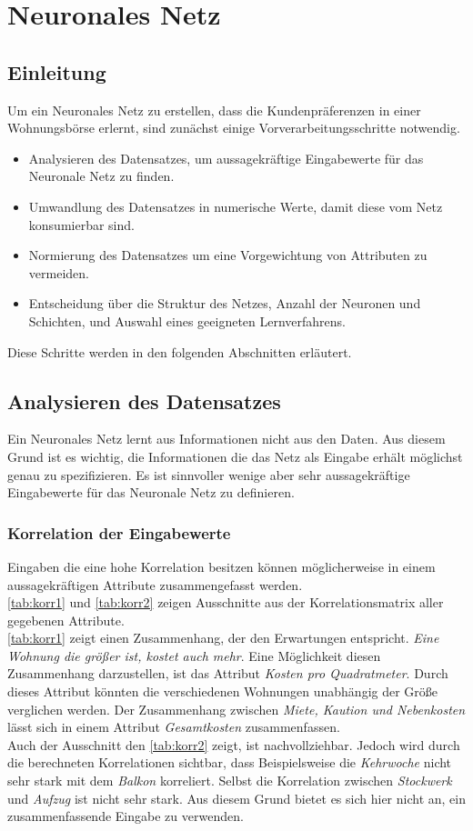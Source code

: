 \section{Neuronales Netz}\label{sec:kaptiel}
\subsection{Einleitung}
Um ein Neuronales Netz zu erstellen, dass die Kundenpräferenzen in einer Wohnungsbörse erlernt,
sind zunächst einige Vorverarbeitungsschritte notwendig.
\begin{itemize}
    \item Analysieren des Datensatzes, um aussagekräftige Eingabewerte für das Neuronale Netz zu
            finden.
    \item Umwandlung des Datensatzes in numerische Werte, damit diese vom Netz konsumierbar sind.
    \item Normierung des Datensatzes um eine Vorgewichtung von Attributen zu vermeiden.
    \item Entscheidung über die Struktur des Netzes, Anzahl der Neuronen und Schichten, und Auswahl 
            eines geeigneten Lernverfahrens.
\end{itemize}
Diese Schritte werden in den folgenden Abschnitten erläutert. 

\subsection{Analysieren des Datensatzes}
Ein Neuronales Netz lernt aus Informationen nicht aus den Daten. Aus diesem Grund ist es wichtig, 
die Informationen die das Netz als Eingabe erhält möglichst genau zu spezifizieren. Es ist 
sinnvoller wenige aber sehr aussagekräftige Eingabewerte für das Neuronale Netz zu definieren.
\subsubsection{Korrelation der Eingabewerte} 
Eingaben die eine hohe Korrelation besitzen können möglicherweise in einem aussagekräftigen Attribute
zusammengefasst werden. \\
\autoref{tab:korr1} und \autoref{tab:korr2} zeigen Ausschnitte aus der Korrelationsmatrix aller 
gegebenen Attribute. \\
\autoref{tab:korr1} zeigt einen Zusammenhang, der den Erwartungen entspricht. \textit{Eine Wohnung die größer ist, kostet auch mehr}.
Eine Möglichkeit diesen Zusammenhang darzustellen, ist das Attribut \textit{Kosten pro Quadratmeter}. Durch dieses Attribut
könnten die verschiedenen Wohnungen unabhängig der Größe verglichen werden. Der Zusammenhang zwischen \textit{Miete, Kaution und Nebenkosten}
lässt sich in einem Attribut \textit{Gesamtkosten} zusammenfassen.\\
Auch der Ausschnitt den \autoref{tab:korr2} zeigt, ist nachvollziehbar. Jedoch wird durch die berechneten Korrelationen sichtbar, 
dass Beispielsweise die \textit{Kehrwoche} nicht sehr stark mit dem \textit{Balkon} korreliert. Selbst die Korrelation zwischen
\textit{Stockwerk} und \textit{Aufzug} ist nicht sehr stark. Aus diesem Grund bietet es sich hier nicht an, ein zusammenfassende 
Eingabe zu verwenden.

